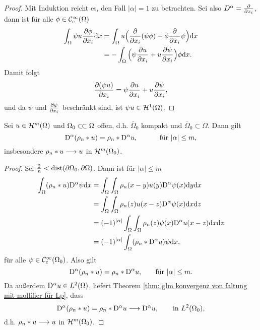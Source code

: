 \begin{proof}
	Mit Induktion reicht es, den Fall \(|\alpha|=1\) zu betrachten. Sei also \(D^\alpha=\frac{\partial}{\partial x_i}\), dann ist für alle \(\phi\in\mathcal{C}_{\mathrm{c}}^\infty(\Omega)\)
	\begin{align*}
		\int_\Omega\psi u\frac{\partial\phi}{\partial x_i}\mathrm{d}x
		&=\int_\Omega u\Big(\frac{\partial}{\partial x_i}(\psi\phi)-\phi\frac{\partial}{\partial x_i}\psi\Big)\mathrm{d}x\\
		&=-\int_\Omega\Big(\psi\frac{\partial u}{\partial x_i}+u\frac{\partial\psi}{\partial x_i}\Big)\phi\mathrm{d}x.
	\end{align*}
	Damit folgt
	\begin{equation*}
		\frac{\partial(\psi u)}{\partial x_i}=\psi\frac{\partial u}{\partial x_i}+u\frac{\partial \psi}{\partial x_i},
	\end{equation*}
	und da \(\psi\) und \(\frac{\partial\psi}{\partial x_i}\) beschränkt sind, ist \(\psi u\in\mathcal{H}^1(\Omega)\).
\end{proof}
\begin{lem}\label{lem: ableitung in faltung reinziehen für mollifier}
	Sei \(u\in\mathcal{H}^m(\Omega)\) und \(\Omega_0\ssubset\Omega\) offen, d.h. \(\overline{\Omega}_0\) kompakt und \(\overline{\Omega}_0\subset\Omega\). Dann gilt
	\begin{equation*}
		\mathrm{D}^\alpha(\rho_n\ast u)=\rho_n\ast\mathrm{D}^\alpha u,\;\;\;\;\;\;\;\;\;\;\text{ für }|\alpha|\leq m,
	\end{equation*}
	insbesondere \(\rho_n\ast u\longrightarrow u\) in \(\mathcal{H}^m(\Omega_0)\).
\end{lem}
\begin{proof}
	Sei \(\frac{2}{n}<\operatorname{dist}(\partial\Omega_0,\partial\Omega)\). Dann ist für \(|\alpha|\leq m\)
	\begin{align*}
		\int_\Omega(\rho_n\ast u)\mathrm{D}^\alpha\psi\mathrm{d}x
		&=\int_\Omega\int_\Omega\rho_n(x-y)u(y)\mathrm{D}^\alpha\psi(x)\mathrm{d}y\mathrm{d}x\\
		&=\int_\Omega\int_\Omega\rho_n(z)u(x-z)\mathrm{D}^\alpha\psi(x)\mathrm{d}x\mathrm{d}z\\
		&=(-1)^{|\alpha|}\int_\Omega\int_\Omega\rho_n(z)\psi(x)\mathrm{D}^\alpha u(x-z)\mathrm{d}x\mathrm{d}z\\
		&=(-1)^{|\alpha|}\int_\Omega(\rho_n\ast\mathrm{D}^\alpha u)\psi\mathrm{d}x,
	\end{align*}
	für alle \(\psi\in\mathcal{C}_{\mathrm{c}}^\infty(\Omega_0)\). Also gilt
	\begin{equation*}
		\mathrm{D}^\alpha(\rho_n\ast u)=\rho_n\ast\mathrm{D}^\alpha u,\;\;\;\;\;\,\text{ für }|\alpha|\leq m.
	\end{equation*}
	Da außerdem \(\mathrm{D}^\alpha u\in L^2(\Omega)\), liefert Theorem \ref{thm: glm konvergenz von faltung mit mollifier für Lp}, dass
	\begin{equation*}
		\mathrm{D}^\alpha(\rho_n\ast u)=\rho_n\ast\mathrm{D}^\alpha u\longrightarrow\mathrm{D}^\alpha u,\;\;\;\;\;\;\text{ in }L^2(\Omega_0),
	\end{equation*}
	d.h. \(\rho_n\ast u\longrightarrow u\) in \(\mathcal{H}^m(\Omega_0)\).
\end{proof}
